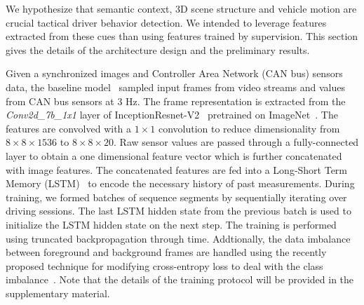\documentclass[10pt,twocolumn,letterpaper]{article}
\begin{document}
We hypothesize that semantic context, 3D scene structure and vehicle motion are crucial tactical driver behavior detection. We intended to leverage features extracted from these cues than using features trained by supervision. This section gives the details of the architecture design and the preliminary results. 

Given a synchronized images and Controller
 Area Network (CAN bus) sensors data, the baseline model~\cite{RamanishkaCVPR2018} sampled input frames from video streams and values from CAN bus sensors at 3 Hz. The frame representation is extracted from the \textit{Conv2d\_7b\_1x1} layer of InceptionResnet-V2~\cite{SzegedyIV16} pretrained on ImageNet~\cite{Deng09imagenet}. The features are convolved with a $1 \times 1$ convolution to reduce
dimensionality from $8 \times 8 \times 1536$ to
$8 \times 8 \times 20$. Raw sensor values are passed through a fully-connected layer to obtain a one dimensional feature vector which is further concatenated with image features.
The concatenated features are fed into a Long-Short Term Memory (LSTM)~\cite{Hochreiter:1997:LSM:1246443.1246450} to encode the necessary history of past measurements. %
During training, we formed batches of sequence segments by sequentially iterating over driving sessions. The last LSTM hidden state from the previous batch is used to initialize the LSTM hidden state on the next step. The training is performed using truncated backpropagation through time. Addtionally, the data imbalance between foreground and background frames are handled using the recently proposed technique for modifying cross-entropy loss to deal with the class imbalance~\cite{Lin2017b}. Note that the details of the training protocol will be provided in the supplementary material.

%
%
\end{document}
